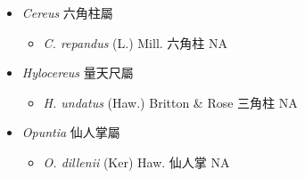 
  \begin{itemize}
 \item[] \textit{Cereus} 六角柱屬
                                
  \begin{itemize}
        \item[] \textit{C. repandus} (L.) Mill.  六角柱   NA
  \end{itemize}
 \item[] \textit{Hylocereus} 量天尺屬
                                
  \begin{itemize}
        \item[] \textit{H. undatus} (Haw.) Britton \& Rose  三角柱   NA
  \end{itemize}
 \item[] \textit{Opuntia} 仙人掌屬
                                
  \begin{itemize}
        \item[] \textit{O. dillenii} (Ker) Haw.  仙人掌   NA
  \end{itemize}
  \end{itemize}
